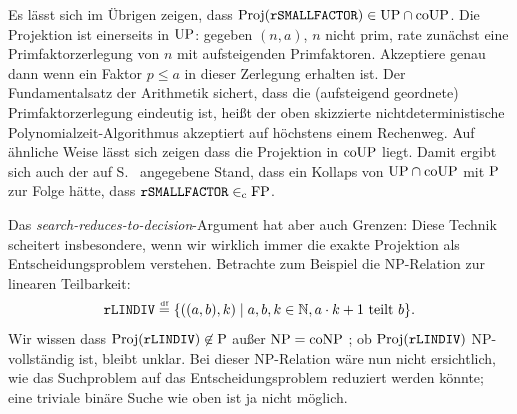 Es lässt sich im Übrigen zeigen, dass $\Proj(\mathtt{rSMALLFACTOR})\in\UP\cap\coUP$.
Die Projektion ist einerseits in $\UP$: gegeben $(n, a)$, $n$ nicht prim, rate zunächst eine Primfaktorzerlegung von $n$ mit aufsteigenden Primfaktoren. Akzeptiere genau dann wenn ein Faktor $p\leq a$ in dieser Zerlegung erhalten ist. Der Fundamentalsatz der Arithmetik sichert, dass die (aufsteigend geordnete) Primfaktorzerlegung eindeutig ist, heißt der oben skizzierte nichtdeterministische Polynomialzeit-Algorithmus akzeptiert auf höchstens einem Rechenweg.
Auf ähnliche Weise lässt sich zeigen dass die Projektion in $\coUP$ liegt.
Damit ergibt sich auch der auf S.~\pageref{label:lösbarkeit} angegebene Stand, dass ein Kollaps von $\UP\cap\coUP$ mit $\P$ zur Folge hätte, dass $\mathtt{rSMALLFACTOR}\inc\FP$.





Das \emph{search-reduces-to-decision}-Argument hat aber auch Grenzen:
Diese Technik scheitert insbesondere, wenn wir wirklich immer die exakte Projektion als Entscheidungsproblem verstehen. Betrachte zum Beispiel die NP-Relation zur linearen Teilbarkeit:
\[ \mathtt{rLINDIV} \defeq \{ ((a, b), k) \mid a,b,k\in\mathbb N, a\cdot k + 1\text{ teilt } b\}. \]
Wir wissen dass $\Proj(\mathtt{rLINDIV})\not\in \P$ außer $\NP=\coNP$ \parencite{adleman_reducibility_1977}; ob $\Proj(\mathtt{rLINDIV})$ NP-vollständig ist, bleibt unklar.
Bei dieser NP-Relation wäre nun nicht ersichtlich, wie das Suchproblem auf das Entscheidungsproblem reduziert werden könnte; eine triviale binäre Suche wie oben ist ja nicht möglich.

